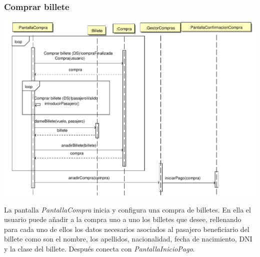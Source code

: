 \documentclass[11pt, a4paper, twoside, titlepage]{article}
\begin{document}
			\subsubsection{Comprar billete}
				\vfill
				\begin{center}
					\includegraphics[scale=.7]{diseno/diagramas/comprarbillete.pdf}
				\end{center}
				\vfill

				La pantalla {\itshape PantallaCompra} inicia y configura una compra de billetes.
				En ella el usuario puede añadir a la compra uno a uno los billetes que desee, rellenando para cada uno de ellos los datos necesarios asociados al pasajero beneficiario del billete como son el nombre, los apellidos, nacionalidad, fecha de nacimiento, DNI y la clase del billete. Después conecta con {\itshape PantallaInicioPago}.
			
\end{document}
